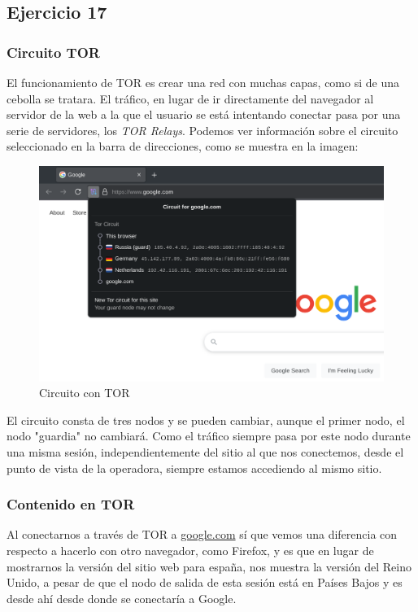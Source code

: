 \subsection{Ejercicio 17}
\graphicspath{ {img/17} }

\subsubsection{Circuito TOR}

El funcionamiento de TOR es crear una red con muchas capas, como si de una cebolla se tratara. El tráfico, en lugar de ir directamente del navegador al servidor de la web a la que el usuario se está intentando conectar pasa por una serie de servidores, los \textit{TOR Relays}. Podemos ver información sobre el circuito seleccionado en la barra de direcciones, como se muestra en la imagen:

\begin{figure}[H]
    \centering
    \includegraphics[width=\textwidth]{tor-google-circuit.png}
    \caption{Circuito con TOR}
\end{figure}

El circuito consta de tres nodos y se pueden cambiar, aunque el primer nodo, el nodo "guardia" no cambiará. Como el tráfico siempre pasa por este nodo durante una misma sesión, independientemente del sitio al que nos conectemos, desde el punto de vista de la operadora, siempre estamos accediendo al mismo sitio.

\subsubsection{Contenido en TOR}

Al conectarnos a través de TOR a \url{google.com} sí que vemos una diferencia con respecto a hacerlo con otro navegador, como Firefox, y es que en lugar de mostrarnos la versión del sitio web para españa, nos muestra la versión del Reino Unido, a pesar de que el nodo de salida de esta sesión está en Países Bajos y es desde ahí desde donde se conectaría a Google.

